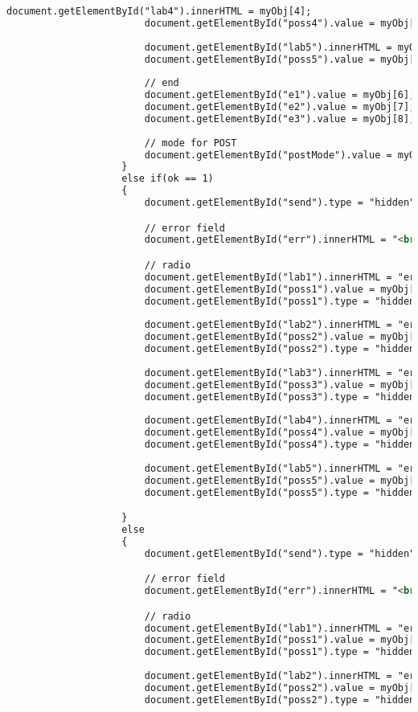 \documentclass{scrartcl}
\begin{document}
\begin{itemize}
\begin{lstlisting}[language=html]
						document.getElementById("lab4").innerHTML = myObj[4];
						document.getElementById("poss4").value = myObj[4];
	
						document.getElementById("lab5").innerHTML = myObj[5];
						document.getElementById("poss5").value = myObj[5];
	
						// end
						document.getElementById("e1").value = myObj[6];
						document.getElementById("e2").value = myObj[7];
						document.getElementById("e3").value = myObj[8];
	
						// mode for POST
						document.getElementById("postMode").value = myObj[9];
					}
					else if(ok == 1)
					{
						document.getElementById("send").type = "hidden";

						// error field
						document.getElementById("err").innerHTML = "<br>In der Lektionsdatei befinden sich Zeichen die nicht zulässig sind!<br>";	

						// radio
						document.getElementById("lab1").innerHTML = "error";
						document.getElementById("poss1").value = myObj[1];
						document.getElementById("poss1").type = "hidden";
	
						document.getElementById("lab2").innerHTML = "error";
						document.getElementById("poss2").value = myObj[2];
						document.getElementById("poss2").type = "hidden";
	
						document.getElementById("lab3").innerHTML = "error";
						document.getElementById("poss3").value = myObj[3];
						document.getElementById("poss3").type = "hidden";
	
						document.getElementById("lab4").innerHTML = "error";
						document.getElementById("poss4").value = myObj[4];
						document.getElementById("poss4").type = "hidden";
	
						document.getElementById("lab5").innerHTML = "error";
						document.getElementById("poss5").value = myObj[5];	
						document.getElementById("poss5").type = "hidden";						

					}
					else
					{
						document.getElementById("send").type = "hidden";

						// error field
						document.getElementById("err").innerHTML = "<br>Die Datei kann nicht geöffnet werden!<br>";	

						// radio
						document.getElementById("lab1").innerHTML = "error";
						document.getElementById("poss1").value = myObj[1];
						document.getElementById("poss1").type = "hidden";
	
						document.getElementById("lab2").innerHTML = "error";
						document.getElementById("poss2").value = myObj[2];
						document.getElementById("poss2").type = "hidden";
	

\end{lstlisting}
\end{itemize}
\end{document}
